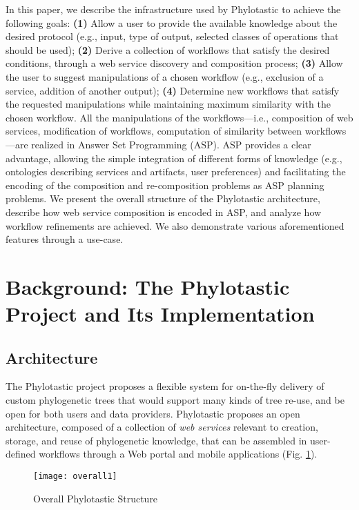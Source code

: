 \documentclass{new_tlp}
\begin{document}
In this paper, we describe the infrastructure used by Phylotastic to achieve the following goals:
{\bf (1)} Allow a user to provide the available knowledge about the desired protocol (e.g., input, type of
output, selected classes of operations that should be used); 
{\bf (2)} Derive a collection of workflows
that satisfy the desired conditions, through a web service discovery and composition process; 
{\bf (3)} Allow the user to suggest manipulations of a chosen workflow (e.g., exclusion of a service, addition
of another output); 
{\bf (4)} Determine new workflows that satisfy the requested manipulations while 
maintaining maximum similarity with the chosen workflow. All the manipulations of the workflows---i.e., 
composition of web services, modification of workflows, computation of similarity between workflows---are
realized in Answer Set Programming (ASP). ASP provides a clear advantage, allowing the simple integration
of different forms of knowledge (e.g., ontologies describing services and artifacts, user preferences) and
facilitating the encoding of the composition and re-composition problems as ASP planning problems. We present
the overall structure of the Phylotastic architecture, describe how web service composition is encoded in ASP,
and analyze how workflow refinements are achieved. We also demonstrate various aforementioned features 
through a use-case. 
 
\section{Background: The Phylotastic Project and Its Implementation}
 
\subsection{Architecture}

The Phylotastic project proposes  a flexible system for on-the-fly delivery of custom 
phylogenetic trees that would support many kinds of tree re-use, and be open 
for both users and data providers. Phylotastic proposes an open architecture, composed of a collection of \emph{web services} relevant 
to creation, storage, and reuse of phylogenetic knowledge, that can be assembled in user-defined workflows through a Web portal and mobile applications (Fig. \ref{overall}).

\begin{figure}[htbp]
  \centering \texttt{[image: overall1]}
  \caption{Overall Phylotastic Structure}
  \label{overall}
\end{figure}
\end{document}
